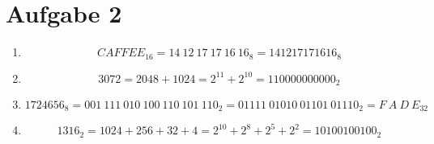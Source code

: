 \documentclass{scrreprt}
\begin{document}
    \section{Aufgabe 2}
    \begin{enumerate}[label = (\alph*)]
        \item
            \begin{equation*}
                {CAFFEE}_{16} = {14\ 12\ 17\ 17\ 16\ 16}_8 = {141217171616}_8
            \end{equation*}
        \item
            \begin{equation*}
                3072 = 2048 + 1024 = 2^{11} + 2^{10} = {110000000000}_2
            \end{equation*}
        \item
            \begin{equation*}
                {1724656}_8 = {001\ 111\ 010\ 100\ 110\ 101\ 110}_2 = {01111\ 01010\ 01101\ 01110}_2 
                    = {F\ A\ D\ E}_{32}
            \end{equation*}
        \item 
            \begin{equation*}
                1316_2 = 1024 + 256 + 32 + 4 = 2^{10} + 2^8 + 2^5 + 2^2 = {10100100100}_2
            \end{equation*}
    \end{enumerate}
\end{document}
